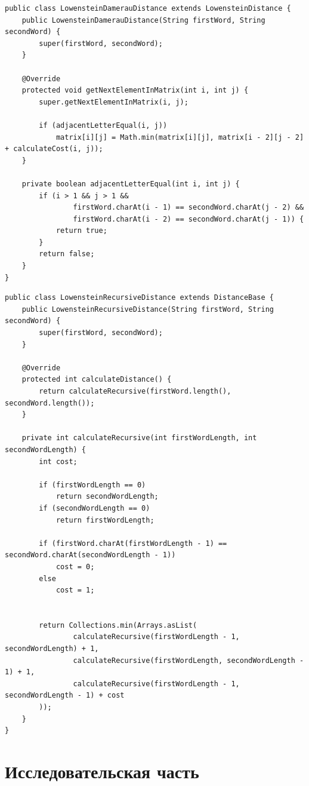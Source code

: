 \documentclass[12pt]{report}
\begin{document}
\begin{lstlisting}[label=some-code,caption=Класс нахождения расстояния Дамерау-Левенштейна матрично]
public class LowensteinDamerauDistance extends LowensteinDistance {
    public LowensteinDamerauDistance(String firstWord, String secondWord) {
        super(firstWord, secondWord);
    }

    @Override
    protected void getNextElementInMatrix(int i, int j) {
        super.getNextElementInMatrix(i, j);

        if (adjacentLetterEqual(i, j))
            matrix[i][j] = Math.min(matrix[i][j], matrix[i - 2][j - 2] + calculateCost(i, j));
    }

    private boolean adjacentLetterEqual(int i, int j) {
        if (i > 1 && j > 1 &&
                firstWord.charAt(i - 1) == secondWord.charAt(j - 2) &&
                firstWord.charAt(i - 2) == secondWord.charAt(j - 1)) {
            return true;
        }
        return false;
    }
}
\end{lstlisting}


\begin{lstlisting}[label=some-code,caption=Класс нахождения расстояния Дамерау-Левенштейна рекурсивно]
public class LowensteinRecursiveDistance extends DistanceBase {
    public LowensteinRecursiveDistance(String firstWord, String secondWord) {
        super(firstWord, secondWord);
    }

    @Override
    protected int calculateDistance() {
        return calculateRecursive(firstWord.length(), secondWord.length());
    }

    private int calculateRecursive(int firstWordLength, int secondWordLength) {
        int cost;

        if (firstWordLength == 0)
            return secondWordLength;
        if (secondWordLength == 0)
            return firstWordLength;

        if (firstWord.charAt(firstWordLength - 1) == secondWord.charAt(secondWordLength - 1))
            cost = 0;
        else
            cost = 1;


        return Collections.min(Arrays.asList(
                calculateRecursive(firstWordLength - 1, secondWordLength) + 1,
                calculateRecursive(firstWordLength, secondWordLength - 1) + 1,
                calculateRecursive(firstWordLength - 1, secondWordLength - 1) + cost
        ));
    }
}
\end{lstlisting}


\chapter{Исследовательская часть}
\end{document}
